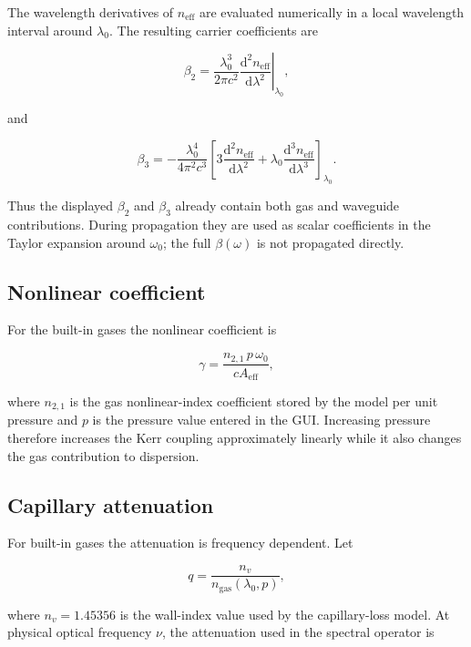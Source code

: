 \documentclass[11pt,a4paper]{article}
\newcommand{\dd}{\mathrm{d}}
\begin{document}
The wavelength derivatives of $n_{\mathrm{eff}}$ are evaluated numerically in
a local wavelength interval around $\lambda_0$. The resulting carrier
coefficients are

\begin{equation}
\boxed{
\beta_2
=
\frac{\lambda_0^3}{2\pi c^2}
\left.
\frac{\dd^2 n_{\mathrm{eff}}}{\dd\lambda^2}
\right|_{\lambda_0},
}
\end{equation}

and

\begin{equation}
\boxed{
\beta_3
=
-\frac{\lambda_0^4}{4\pi^2c^3}
\left[
3\frac{\dd^2 n_{\mathrm{eff}}}{\dd\lambda^2}
+
\lambda_0\frac{\dd^3 n_{\mathrm{eff}}}{\dd\lambda^3}
\right]_{\lambda_0}.
}
\end{equation}

Thus the displayed $\beta_2$ and $\beta_3$ already contain both gas and
waveguide contributions. During propagation they are used as scalar coefficients
in the Taylor expansion around $\omega_0$; the full $\beta(\omega)$ is not
propagated directly.

\subsection{Nonlinear coefficient}

For the built-in gases the nonlinear coefficient is

\begin{equation}
\boxed{
\gamma
=
\frac{n_{2,1}\,p\,\omega_0}
{cA_{\mathrm{eff}}},
}
\end{equation}

where $n_{2,1}$ is the gas nonlinear-index coefficient stored by the model per
unit pressure and $p$ is the pressure value entered in the GUI. Increasing
pressure therefore increases the Kerr coupling approximately linearly while it
also changes the gas contribution to dispersion.

\subsection{Capillary attenuation}

For built-in gases the attenuation is frequency dependent. Let

\begin{equation}
q=\frac{n_v}{n_{\mathrm{gas}}(\lambda_0,p)},
\end{equation}

where $n_v=1.45356$ is the wall-index value used by the capillary-loss model.
At physical optical frequency $\nu$, the attenuation used in the spectral
operator is
\end{document}
